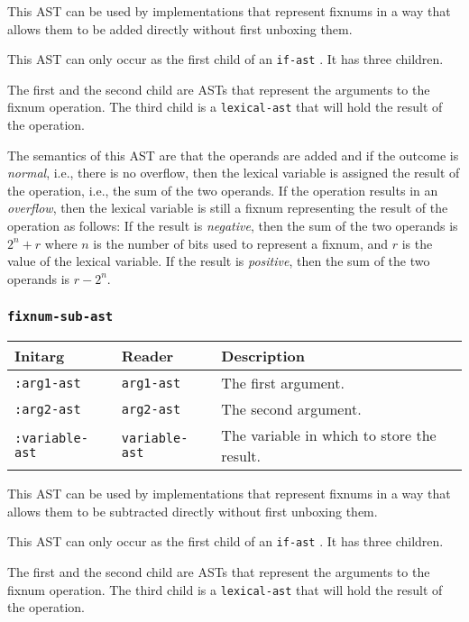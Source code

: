 This AST can be used by implementations that represent fixnums in a
way that allows them to be added directly without first unboxing
them.

This AST can only occur as the first child of an \texttt{if-ast}
.  It has three children.

The first and the second child are ASTs that represent the arguments
to the fixnum operation.  The third child is a
\texttt{lexical-ast} that will hold the result of the operation.

The semantics of this AST are that the operands are added and if the
outcome is \emph{normal}, i.e., there is no overflow, then the lexical
variable is assigned the result of the operation, i.e., the sum of the
two operands.  If the operation results in an \emph{overflow}, then
the lexical variable is still a fixnum representing the result of the
operation as follows:  If the result is \emph{negative}, then the
sum of the two operands is $2^n + r$ where $n$ is the number of bits
used to represent a fixnum, and $r$ is the value of the lexical
variable.  If the result is \emph{positive}, then the sum of the two
operands is $r - 2^n$.

\subsubsection{\texttt{fixnum-sub-ast}}
\label{fixnum-sub-ast}

\begin{tabular}{|l|l|l|}
\hline
Initarg & Reader & Description\\
\hline\hline
\texttt{:arg1-ast} & \texttt{arg1-ast} & The first argument.\\
\hline
\texttt{:arg2-ast} & \texttt{arg2-ast} & The second argument.\\
\hline
\texttt{:variable-ast} & \texttt{variable-ast} & The variable in which to store the result.\\
\hline
\end{tabular}

This AST can be used by implementations that represent fixnums in a
way that allows them to be subtracted directly without first unboxing
them.

This AST can only occur as the first child of an \texttt{if-ast}
.  It has three children.

The first and the second child are ASTs that represent the arguments
to the fixnum operation.  The third child is a
\texttt{lexical-ast} that will hold the result of the operation.

